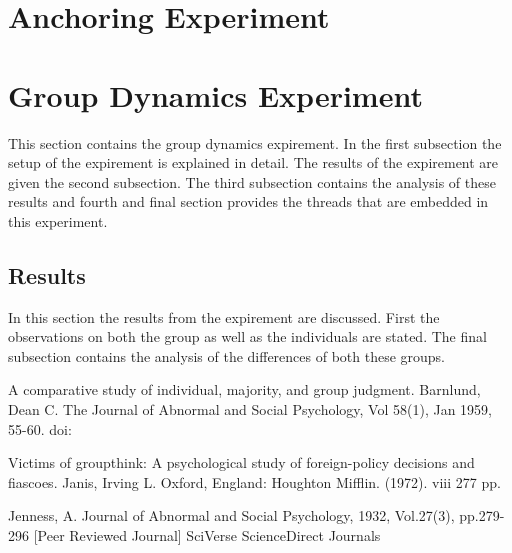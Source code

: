 \documentclass{article}
\begin{document}
\section{Anchoring Experiment}



\section{Group Dynamics Experiment}
This section contains the group dynamics expirement. In the first subsection the setup of the expirement is explained in detail. The results of the expirement are given the second subsection. The third subsection contains the analysis of these results and fourth and final section provides the threads that are embedded in this experiment.

\subsection{Results}
In this section the results from the expirement are discussed. First the observations on both the group as well as the individuals are stated. The final subsection contains the analysis of the differences of both these groups.




\begin{thebibliography}{30}

 A comparative study of individual, majority, and group judgment.
Barnlund, Dean C.
The Journal of Abnormal and Social Psychology, Vol 58(1), Jan 1959, 55-60. doi:

 Victims of groupthink: A psychological study of foreign-policy decisions and fiascoes.
Janis, Irving L.
Oxford, England: Houghton Mifflin. (1972). viii 277 pp.

 Jenness, A. Journal of Abnormal and Social Psychology, 1932, Vol.27(3), pp.279-296 [Peer Reviewed Journal]
SciVerse ScienceDirect Journals
\end{thebibliography}
\end{document}

